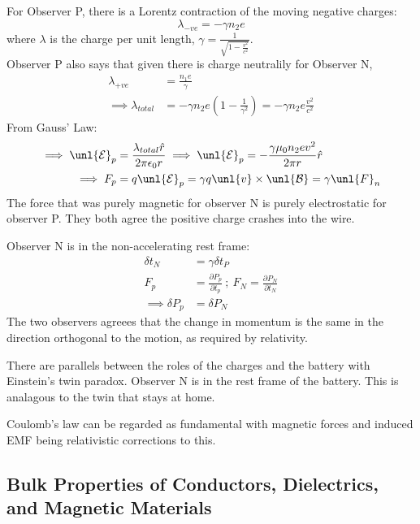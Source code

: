 \documentclass[a4paper, 11pt, normalem]{report}
\newcommand\p{\partial}
\newcommand\E{\mathcal{E}}
\newcommand\uE{\unl{\E}}
\newcommand\B{\mathcal{B}}
\newcommand\uB{\unl{\B}}
\newcommand\eno{\epsilon_0}
\newcommand\hr{\hat{r}}
\newcommand\lam{\lambda}
\begin{document}
\chapter{}
For Observer P, there is a Lorentz contraction of the moving negative charges:
\begin{equation}
    \lam_{-ve} = -\gamma n_2e
\end{equation}
where $\lam$ is the charge per unit length, $\gamma = \frac{1}{\sqrt{1 - \tfrac{v^2}{c^2}}}$. \\
Observer P also says that given there is charge neutralily for Observer N,
\begin{align}
    \lam_{+ve} &= \frac{n_1 e}{\gamma} \\
    \implies \lam_{total} &= -\gamma n_2e \left(1 - \frac{1}{\gamma^2}\right) = -\gamma n_2e\frac{v^2}{c^2}
\end{align}
From Gauss' Law:
\begin{align}
    \implies \uE_p &= \frac{\lam_{total}\hr}{2\pi\eno r} \implies \uE_p = -\frac{\gamma \mu_0n_2ev^2}{2\pi r}\hr \\
    \implies F_p &= q\uE_p = \gamma q\unl{v} \times \uB = \gamma \unl{F}_n
\end{align}
The force that was purely magnetic for observer N is purely electrostatic for observer P.
They both agree the positive charge crashes into the wire.

Observer N is in the non-accelerating rest frame:
\begin{align}
    \delta t_N &= \gamma \delta t_P \\
    F_p &= \frac{\p P_p}{\p t_p} ~;~ F_N = \frac{\p P_N}{\p t_N} \\
    \implies \delta P_p &= \delta P_N
\end{align}
The two observers agreees that the change in momentum is the same in the direction orthogonal to the motion, as required by relativity.

There are parallels between the roles of the charges and the battery with Einstein's twin paradox.
Observer N is in the rest frame of the battery.
This is analagous to the twin that stays at home.

Coulomb's law can be regarded as fundamental with magnetic forces and induced EMF being relativistic corrections to this.

\section{Bulk Properties of Conductors, Dielectrics, and Magnetic Materials}
\end{document}
